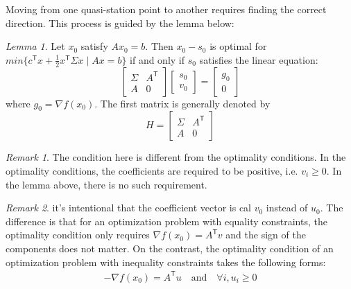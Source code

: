 \documentclass[letterpaper, oneside]{book}
\theoremstyle{definition}
\theoremstyle{remark}
\newtheorem*{remark}{Remark}
\newtheorem{lemma}[theorem]{Lemma}
\begin{document}
Moving from one quasi-station point to another requires finding the correct direction. This process is guided by the lemma below:

\begin{lemma}\label{lemma_search_direction}
	Let $x_0$ satisfy $Ax_0 = b$. Then $x_0 - s_0$ is optimal for $min\{ c^{\mathsf{T}}x + \frac{1}{2} x^{\mathsf{T}}\Sigma{}x \;|\; Ax = b \}$ if and only if $s_0$ satisfies the linear equation:
	\begin{displaymath}
		\begin{bmatrix}
			\Sigma{} & A^{\mathsf{T}} \\
			A & 0
		\end{bmatrix}		
		\begin{bmatrix}
			s_0\\
			v_0
		\end{bmatrix}
		= 
		\begin{bmatrix}
			g_0 \\
			0
		\end{bmatrix}
	\end{displaymath}
	where $g_0 = \nabla{}f(x_0)$. The first matrix is generally denoted by
	\begin{displaymath}
		H = \begin{bmatrix}
			\Sigma{} & A^{\mathsf{T}} \\
			A & 0
		\end{bmatrix}
	\end{displaymath}
\end{lemma}

\begin{remark}
	The condition here is different from the optimality conditions. In the optimality conditions, the coefficients are required to be positive, i.e. $v_i \ge 0$. In the lemma above, there is no such requirement.
\end{remark}

\begin{remark}
	it's intentional that the coefficient vector is cal $v_0$ instead of $u_0$. The difference is that for an optimization problem with equality constraints, the optimality condition only requires $\nabla f(x_0)  = A^{\mathsf{T}} v$ and the sign of the components does not matter. On the contrast, the optimality condition of an optimization problem with inequality constraints takes the following forms:
	\begin{align*}
		-\nabla f(x_0) = A^{\mathsf{T}} u \quad \mathrm{and} \quad \forall i, u_i \geqslant 0
	\end{align*}
\end{remark}
\end{document}
